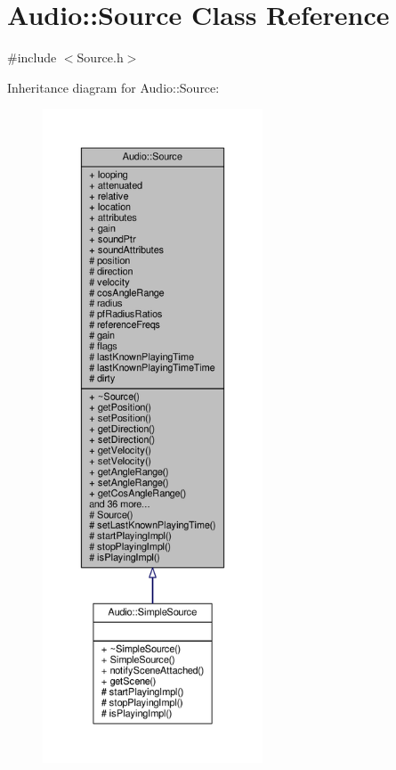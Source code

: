 \hypertarget{classAudio_1_1Source}{}\section{Audio\+:\+:Source Class Reference}
\label{classAudio_1_1Source}


{\ttfamily \#include $<$Source.\+h$>$}



Inheritance diagram for Audio\+:\+:Source\+:
\nopagebreak
\begin{figure}[H]
\begin{center}
\leavevmode
\includegraphics[height=550pt]{d3/d72/classAudio_1_1Source__inherit__graph}
\end{center}
\end{figure}


